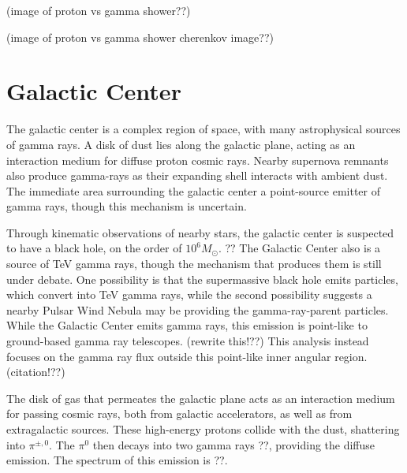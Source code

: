 (image of proton vs gamma shower??)

(image of proton vs gamma shower cherenkov image??)


\section{Galactic Center}
The galactic center is a complex region of space, with many astrophysical sources of gamma rays.
A disk of dust lies along the galactic plane, acting as an interaction medium for diffuse proton cosmic rays.
Nearby supernova remnants also produce gamma-rays as their expanding shell interacts with ambient dust.
The immediate area surrounding the galactic center a point-source emitter of gamma rays, though this mechanism is uncertain.

Through kinematic observations of nearby stars, the galactic center is suspected to have a black hole, on the order of $10^6 M_{\odot}$. ??
The Galactic Center also is a source of TeV gamma rays, though the mechanism that produces them is still under debate.
One possibility is that the supermassive black hole emits particles, which convert into TeV gamma rays, while the second possibility suggests a nearby Pulsar Wind Nebula may be providing the gamma-ray-parent particles.
While the Galactic Center emits gamma rays, this emission is point-like to ground-based gamma ray telescopes. (rewrite this!??)
This analysis instead focuses on the gamma ray flux outside this point-like inner angular region. (citation!??)


The disk of gas that permeates the galactic plane acts as an interaction medium for passing cosmic rays, both from galactic accelerators, as well as from extragalactic sources.
These high-energy protons collide with the dust, shattering into $\pi^{\pm,0}$.
The $\pi^0$ then decays into two gamma rays ??, providing the diffuse emission.
The spectrum of this emission is ??.


